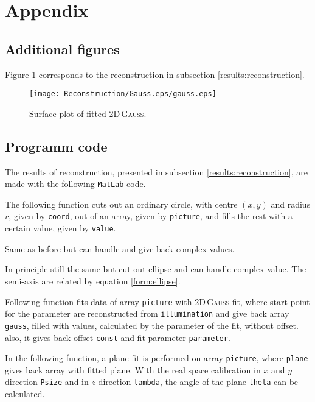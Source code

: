 \documentclass{article}
\begin{document}
\section{Appendix} 
\subsection{Additional figures} \label{appendix:figure}
Figure \ref{fig:gauss} corresponds to the reconstruction in subsection \ref{results:reconstruction}. 
\begin{figure}
    \centering
    \texttt{[image: Reconstruction/Gauss.eps/gauss.eps]}
    \caption{Surface plot of fitted 2D\,\textsc{Gauss}.}
    \label{fig:gauss}
\end{figure}
\subsection{Programm code} \label{appendix:code}
The results of reconstruction, presented in subsection \ref{results:reconstruction}, are made with the following \texttt{MatLab} code.

The following function cuts out an ordinary circle, with centre $(x,y)$ and radius $r$, given by \texttt{coord}, out of an array, given by \texttt{picture}, and fills the rest with a certain value, given by \texttt{value}.

Same as before but can handle and give back complex values.

In principle still the same but cut out ellipse and can handle complex value. The semi-axis are related by equation \ref{form:ellipse}.

Following function fits data of array \texttt{picture} with 2D\,\textsc{Gauss} fit, where start point for the parameter are reconstructed from \texttt{illumination} and give back array \texttt{gauss}, filled with values, calculated by the parameter of the fit, without offset. also, it gives back offset \texttt{const} and fit parameter \texttt{parameter}.

In the following function, a plane fit is performed on array \texttt{picture}, where \texttt{plane} gives back array with fitted plane. With the real space calibration in $x$ and $y$ direction \texttt{Psize} and in $z$ direction \texttt{lambda}, the angle of the plane \texttt{theta} can be calculated.

\end{document}

